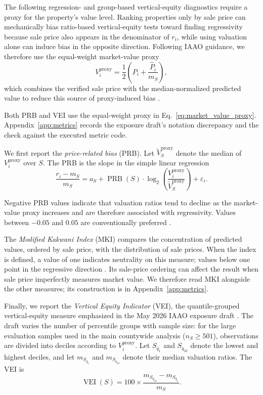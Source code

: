 \documentclass[10pt]{article}
\theoremstyle{definition}
\newcommand{\1}{\mathbf{1}}
\begin{document}
{The following regression- and group-based vertical-equity diagnostics require a proxy for the property's value level. Ranking properties only by sale price can mechanically bias ratio-based vertical-equity tests toward finding regressivity because sale price also appears in the denominator of $r_i$, while using valuation alone can induce bias in the opposite direction. Following IAAO guidance, we therefore use the equal-weight market-value proxy}
\begin{equation}
\label{eq:market_value_proxy}
V_i^{\mathrm{proxy}}
=
\frac{1}{2}
\left(
P_i+\frac{\widehat P_i}{m_S}
\right),
\end{equation}
{which combines the verified sale price with the median-normalized predicted value to reduce this source of proxy-induced bias \cite{IAAO2013Ratio,IAAO2026ExposureRatio}.}

Both PRB and VEI use the equal-weight proxy in Eq.~\eqref{eq:market_value_proxy}. Appendix~\ref{app:metrics} records the exposure draft's notation discrepancy and the check against the executed metric code.

{We first report the \textit{price-related bias} (PRB).}
Let $\widetilde V_S^{\mathrm{proxy}}$ denote the median of $V_i^{\mathrm{proxy}}$ over $S$. The PRB is the slope in the simple linear regression
\begin{equation}
\label{eq:prb}
\frac{r_i-m_S}{m_S}
=
a_S
+
\operatorname{PRB}(S)\cdot
\log_2\left(
\frac{V_i^{\mathrm{proxy}}}
{\widetilde V_S^{\mathrm{proxy}}}
\right)
+
\varepsilon_i.
\end{equation}

Negative PRB values indicate that valuation ratios tend to decline as the market-value proxy increases and are therefore associated with regressivity. Values between $-0.05$ and $0.05$ are conventionally preferred \cite{IAAO2013Ratio}.

The \emph{Modified Kakwani Index} (MKI) compares the concentration of predicted values, ordered by sale price, with the distribution of sale prices. When the index is defined, a value of one indicates neutrality on this measure; values below one point in the regressive direction \cite{IAAO2026ExposureRatio}. Its sale-price ordering can affect the result when sale price imperfectly measures market value. We therefore read MKI alongside the other measures; its construction is in Appendix~\ref{app:metrics}.


Finally, we report the \emph{Vertical Equity Indicator} (VEI), the quantile-grouped vertical-equity measure emphasized in the May 2026 IAAO exposure draft \cite{IAAO2026ExposureRatio}.
The draft varies the number of percentile groups with sample size: for the large evaluation samples used in the main countywide analysis ($n_S\geq 501$), observations are divided into deciles according to $V_i^{\mathrm{proxy}}$. Let $S_{q_1}$ and $S_{q_{10}}$ denote the lowest and highest deciles, and let $m_{S_{q_1}}$ and $m_{S_{q_{10}}}$ denote their median valuation ratios. The VEI is
\begin{equation}
\label{eq:vei}
\operatorname{VEI}(S)
=
100\times
\frac{m_{S_{q_{10}}}-m_{S_{q_1}}}{m_S}.
\end{equation}
\end{document}
